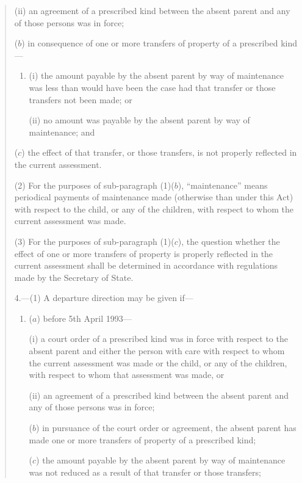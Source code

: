 \documentclass[a4paper]{article}
\begin{document}
{\begin{quotation}
\begin{enumerate}
\begin{enumerate}
(ii) an agreement of a prescribed kind between the absent parent and any of those persons was in force;
\end{enumerate}

($b$) in consequence of one or more transfers of property of a prescribed kind—
\begin{enumerate}\item[]
(i) the amount payable by the absent parent by way of maintenance was less than would have been the case had that transfer or those transfers not been made; or

(ii) no amount was payable by the absent parent by way of maintenance; and
\end{enumerate}

($c$) the effect of that transfer, or those transfers, is not properly reflected in the current assessment.
\end{enumerate}

(2) For the purposes of sub-paragraph (1)($b$), “maintenance” means periodical payments of maintenance made (otherwise than under this Act) with respect to the child, or any of the children, with respect to whom the current assessment was made.

(3) For the purposes of sub-paragraph (1)($c$), the question whether the effect of one or more transfers of property is properly reflected in the current assessment shall be determined in accordance with regulations made by the Secretary of State.

\medskip

4.---(1) A departure direction may be given if—
\begin{enumerate}\item[]
($a$) before 5th April 1993—

(i) a court order of a prescribed kind was in force with respect to the absent parent and either the person with care with respect to whom the current assessment was made or the child, or any of the children, with respect to whom that assessment was made, or

(ii) an agreement of a prescribed kind between the absent parent and any of those persons was in force;

($b$) in pursuance of the court order or agreement, the absent parent has made one or more transfers of property of a prescribed kind;

($c$) the amount payable by the absent parent by way of maintenance was not reduced as a result of that transfer or those transfers;


\end{enumerate}
\end{quotation}}
\end{document}
